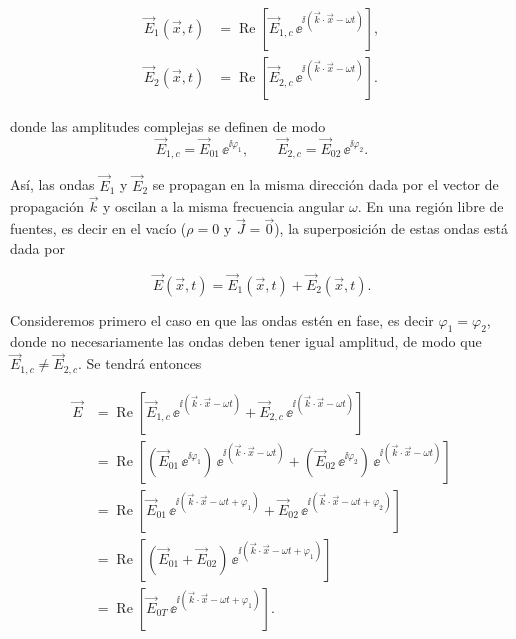 \documentclass[../main.tex]{subfiles}
\begin{document}
\begin{align*}
    \vec E_1(\vec x, t) &=  \operatorname{Re}\left[\vec E_{1,c}\,\ee^{\ii\left(\vec k\cdot\vec x-\omega t\right)}\right] , \\
    \vec E_2(\vec x, t) &=  \operatorname{Re}\left[\vec E_{2,c}\,\ee^{\ii\left(\vec k\cdot\vec x-\omega t\right)}\right] .
\end{align*}

donde las amplitudes complejas se definen de modo
\begin{equation*}
    \vec E_{1,c}=\vec E_{01}\, \ee^{\ii\varphi_1} ,\qquad \vec E_{2,c}=\vec E_{02}\,\ee^{\ii\varphi_2}.
\end{equation*}

Así, las ondas $\vec E_1$ y $\vec E_2$ se propagan en la misma dirección dada por el vector de propagación $\vec k$ y oscilan a la misma frecuencia angular $\omega$. En una región libre de fuentes, es decir en el vacío ($\rho=0$ y $\vec J = \vec 0$), la superposición de estas ondas está dada por

\begin{equation*}
    \vec E(\vec x, t)= \vec E_1(\vec x, t)+ \vec E_2(\vec x, t).
\end{equation*}

Consideremos primero el caso en que las ondas estén en fase, es decir $\varphi_1=\varphi_2$, donde no necesariamente las ondas deben tener igual amplitud, de modo que $\vec E_{1,c}\neq \vec E_{2,c}$. Se tendrá entonces

\begin{align*}
    \vec E &= \operatorname{Re}\left[\vec E_{1,c}\,\ee^{\ii\left(\vec k\cdot\vec x-\omega t\right)}+\vec E_{2,c}\,\ee^{\ii\left(\vec k\cdot\vec x-\omega t\right)}\right] \\
    &= \operatorname{Re}\left[\left(\vec E_{01}\, \ee^{\ii\varphi_1}\right)\,\ee^{\ii\left(\vec k\cdot\vec x-\omega t\right)}+\left(\vec E_{02}\, \ee^{\ii\varphi_2}\right)\,\ee^{\ii\left(\vec k\cdot\vec x-\omega t\right)}\right] \\
    &= \operatorname{Re}\left[\vec E_{01}\,\ee^{\ii\left(\vec k\cdot\vec x-\omega t+\varphi_1\right)}+\vec E_{02}\,\ee^{\ii\left(\vec k\cdot\vec x-\omega t+\varphi_2\right)}\right] \\
    &= \operatorname{Re}\left[\left(\vec E_{01}+\vec E_{02}\right)\,\ee^{\ii\left(\vec k\cdot\vec x-\omega t+\varphi_1\right)}\right] \\
    &= \operatorname{Re}\left[\vec E_{0T}\,\ee^{\ii\left(\vec k\cdot\vec x-\omega t+\varphi_1\right)}\right] .
\end{align*}
\end{document}
